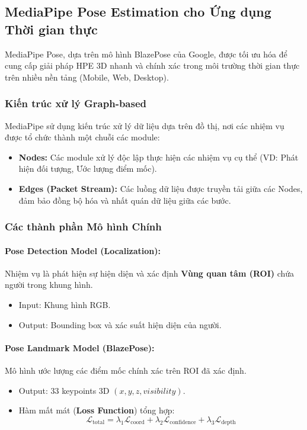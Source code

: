 \subsection{MediaPipe Pose Estimation cho Ứng dụng Thời gian thực}

MediaPipe Pose, dựa trên mô hình BlazePose của Google, được tối ưu hóa để cung cấp giải pháp HPE 3D nhanh và chính xác trong môi trường thời gian thực trên nhiều nền tảng (Mobile, Web, Desktop).

\subsubsection{Kiến trúc xử lý Graph-based}

MediaPipe sử dụng kiến trúc xử lý dữ liệu dựa trên đồ thị, nơi các nhiệm vụ được tổ chức thành một chuỗi các module:
\begin{itemize}
    \item \textbf{Nodes:} Các module xử lý độc lập thực hiện các nhiệm vụ cụ thể (VD: Phát hiện đối tượng, Ước lượng điểm mốc).
    \item \textbf{Edges (Packet Stream):} Các luồng dữ liệu được truyền tải giữa các Nodes, đảm bảo đồng bộ hóa và nhất quán dữ liệu giữa các bước.
\end{itemize}

\subsubsection{Các thành phần Mô hình Chính}

\paragraph{Pose Detection Model (Localization):} Nhiệm vụ là phát hiện sự hiện diện và xác định \textbf{Vùng quan tâm (ROI)} chứa người trong khung hình.
\begin{itemize}
    \item Input: Khung hình RGB.
    \item Output: Bounding box và xác suất hiện diện của người.
\end{itemize}

\paragraph{Pose Landmark Model (BlazePose):} Mô hình ước lượng các điểm mốc chính xác trên ROI đã xác định.
\begin{itemize}
    \item Output: 33 keypoints 3D $(x, y, z, visibility)$.
    \item Hàm mất mát (\textbf{Loss Function}) tổng hợp:
    \begin{equation}
    \mathcal{L}_{\text{total}} = \lambda_1 \mathcal{L}_{\text{coord}} + \lambda_2 \mathcal{L}_{\text{confidence}} + \lambda_3 \mathcal{L}_{\text{depth}}
    \end{equation}
\end{itemize}

